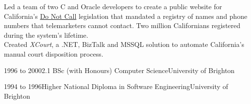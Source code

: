 \documentclass[a4paper,12pt]{article}
\newcommand{\head}[1]{\begin{center}{\large{\textbf{\sc{#1}}}}\nopagebreak\end{center}}
\newcommand{\tab}{\hspace{2em}}
\newcommand{\education}[3]{#1\tab#2\hfill#3}
\begin{document}
Led a team of two C and Oracle developers to create a public website for California's \href{http://www.sfgate.com/cgi-bin/article.cgi?f=/c/a/2003/03/31/MN5478.DTL}{Do Not Call} legislation that mandated a registry of names and phone numbers that telemarketers cannot contact.  Two million Californians registered during the system's lifetime. \\

Created \emph{XCourt}, a .NET, BizTalk and MSSQL solution to automate California's manual court disposition process.

\head{Education}

\education{1996 to 2000}{2.1 BSc (with Honours) Computer Science}{University of Brighton}

\education{1994 to 1996}{Higher National Diploma in Software Engineering}{University of Brighton}
\end{document}
